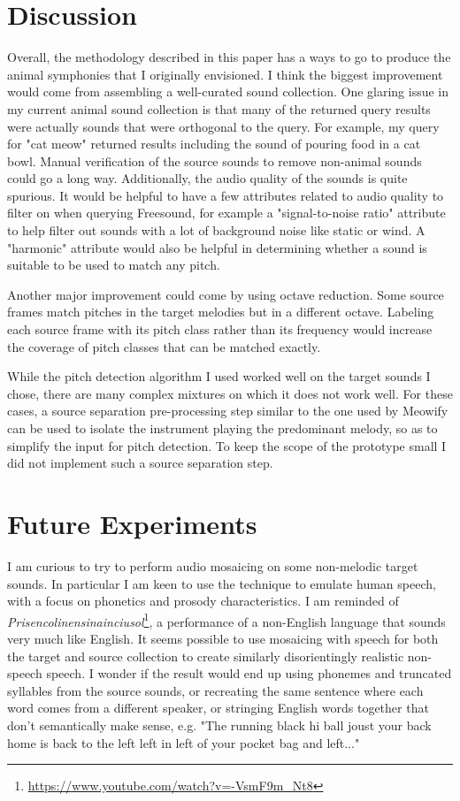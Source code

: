 \documentclass{article}
\begin{document}
\section{Discussion}

Overall, the methodology described in this paper has a ways to go to produce the animal symphonies that I originally envisioned. I think the biggest improvement would come from assembling a well-curated sound collection. One glaring issue in my current animal sound collection is that many of the returned query results were actually sounds that were orthogonal to the query. For example, my query for "cat meow" returned results including the sound of pouring food in a cat bowl. Manual verification of the source sounds to remove non-animal sounds could go a long way. Additionally, the audio quality of the sounds is quite spurious. It would be helpful to have a few attributes related to audio quality to filter on when querying Freesound, for example a "signal-to-noise ratio" attribute to help filter out sounds with a lot of background noise like static or wind. A "harmonic" attribute would also be helpful in determining whether a sound is suitable to be used to match any pitch.

Another major improvement could come by using octave reduction. Some source frames match pitches in the target melodies but in a different octave. Labeling each source frame with its pitch class rather than its frequency would increase the coverage of pitch classes that can be matched exactly.

While the pitch detection algorithm I used worked well on the target sounds I chose, there are many complex mixtures on which it does not work well. For these cases, a source separation pre-processing step similar to the one used by Meowify can be used to isolate the instrument playing the predominant melody, so as to simplify the input for pitch detection. To keep the scope of the prototype small I did not implement such a source separation step.

\section{Future Experiments}

I am curious to try to perform audio mosaicing on some non-melodic target sounds. In particular I am keen to use the technique to emulate human speech, with a focus on phonetics and prosody characteristics. I am reminded of \textit{Prisencolinensinainciusol}\footnote{\url{https://www.youtube.com/watch?v=-VsmF9m_Nt8}}, a performance of a non-English language that sounds very much like English. It seems possible to use mosaicing with speech for both the target and source collection to create similarly disorientingly realistic non-speech speech. I wonder if the result would end up using phonemes and truncated syllables from the source sounds, or recreating the same sentence where each word comes from a different speaker, or stringing English words together that don’t semantically make sense, e.g. "The running black hi ball joust your back home is back to the left left in left of your pocket bag and left..."




\end{document}
